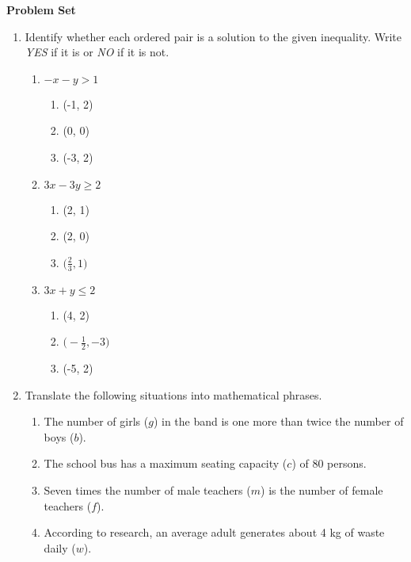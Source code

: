 \textbf{Problem Set}

\vspce

\begin{enumerate}[label = \Alph*. ]
\item \hspce Identify whether each ordered pair is a solution to the given inequality. Write \emph{YES} if it is or \emph{NO} if it is not.
\begin{multicols}{2}
\begin{enumerate}[label = \arabic*. ]
\item \hspce $-x-y>1$
\begin{enumerate}[label = \alph*. ]
\item \hspce (-1, 2)
\item \hspce (0, 0)
\item \hspce (-3, 2) 
\end{enumerate}   
\item \hspce $3x-3y \geq 2$
\begin{enumerate}[label = \alph*. ]
\item \hspce (2, 1)
\item \hspce (2, 0)
\item \hspce $\big(\displaystyle \frac{2}{3}, 1\big)$
\end{enumerate}  

\vfill
\columnbreak

\item \hspce $3x+y \leq 2$
\begin{enumerate}[label = \alph*. ]
\item \hspce (4, 2)
\item \hspce $\big(-\displaystyle \frac{1}{2}, -3\big)$
\item \hspce (-5, 2)
\end{enumerate}  
\end{enumerate}  
\end{multicols} 
\item \hspce Translate the following situations into mathematical phrases.
\begin{enumerate}[label = \arabic*. ]
\item The number of girls ($g$) in the band is one more than twice the number of boys ($b$).
\item The school bus has a
maximum seating capacity
($c$) of 80 persons.
\item Seven times the number
of male teachers ($m$) is the
number of female teachers ($f$).
\item According to research, an
average adult generates
about 4 kg of waste daily ($w$).


\end{enumerate}
\end{enumerate}
